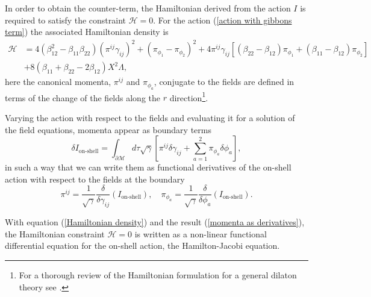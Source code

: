 \documentclass[sn-mathphys,Numbered]{sn-jnl}%
\theoremstyle{thmstyleone}%
\theoremstyle{thmstyletwo}%
\theoremstyle{thmstylethree}%
\begin{document}
In order to obtain the counter-term, the Hamiltonian derived from the action $I$ is required to satisfy the constraint $\mathcal{H}=0$. For the action (\ref{action with gibbons term}) the associated Hamiltonian density is
%
\begin{equation}\label{Hamiltonian density}
\begin{split} 
 \mathcal{H}&=4\left(\beta_{12}^{2}-\beta_{11} \beta_{22}\right)\left(\pi^{i j} \gamma_{i j}\right)^{2}+\left(\pi_{\phi_{1}}-\pi_{\phi_{2}}\right)^{2}+4\pi^{i j} \gamma_{i j} \left[\left(\beta_{22}-\beta_{12}\right) \pi_{\phi_{1}}+\left(\beta_{11}-\beta_{12}\right) \pi_{\phi_{2}}\right]\\
 & +8\left(\beta_{11}+\beta_{22}-2\beta_{12}\right) X^{2} \Lambda,
\end{split} 
\end{equation}
here the canonical momenta, $\pi^{ij}$ and $\pi_{\phi_a}$, conjugate to the fields  are defined in terms of the change of the fields along the $r$ direction\footnote{For a thorough review of the Hamiltonian formulation for a general dilaton theory see \cite{Dyer}. }.

Varying the action with respect to the fields and evaluating it for a solution of the field equations, momenta  appear as boundary terms 
%
\begin{equation}
    \delta I_{\text{on-shell}}=\int_{\partial \mathcal{M}} d \tau  \sqrt{\gamma}\left[\pi^{ij} \delta \gamma_{ij}+\sum_{a=1}^{2} \pi_{\phi_a} \delta \phi_a\right],
\end{equation}
%
in such a way that we can write them as functional derivatives of the on-shell action with respect to the fields at the boundary
%
\begin{equation}\label{momenta as derivatives}
\pi^{i j}=\frac{1}{\sqrt{\gamma}} \frac{\delta}{\delta \gamma_{i j}}\left(I_{\text{on-shell}}\right), \quad \pi_{\phi_a}=\frac{1}{\sqrt{\gamma}} \frac{\delta}{\delta \phi_a}\left(I_{\text{on-shell}}\right).
\end{equation}

With equation (\ref{Hamiltonian density}) and the result (\ref{momenta as derivatives}), the Hamiltonian constraint $\mathcal{H}=0$ is written as a non-linear functional differential equation for the on-shell action, the Hamilton-Jacobi equation. 
\end{document}
